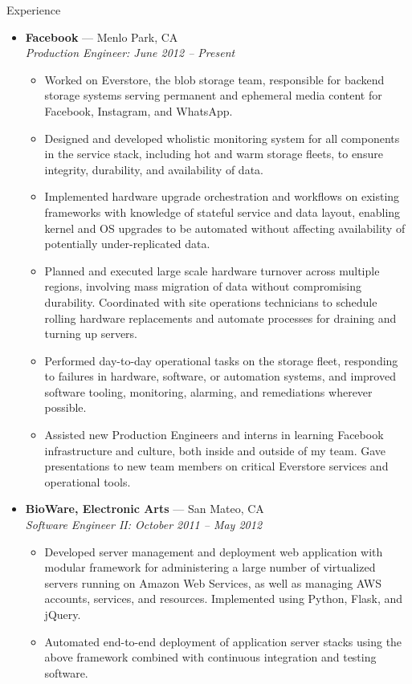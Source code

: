 \documentclass[11pt,oneside]{article}
\newenvironment{ressection}[1]{
    \vspace{8pt}
    {\fontfamily{phv}\selectfont\Large#1}
    \begin{itemize}
    \vspace{3pt}
}{
    \end{itemize}
}
\newcommand{\ressubitem}[1]{
    \vspace{-1pt}
    \item \begin{flushleft} #1 \end{flushleft}
}
\newcommand{\resbigitem}[3]{
    \vspace{-5pt}
    \item
    \textbf{#1} --- #2 \\
    \textit{#3}
}
\newenvironment{ressubsec}[3]{
    \resbigitem{#1}{#2}{#3}
    \vspace{-2pt}
    \begin{itemize}
}{
    \end{itemize}
}
\begin{document}
\begin{ressection}{Experience}

    \begin{ressubsec}{Facebook}{Menlo Park, CA}
    {Production Engineer: June 2012 -- Present}
        \ressubitem{Worked on Everstore, the blob storage team, responsible for backend
            storage systems serving permanent and ephemeral media content for Facebook,
            Instagram, and WhatsApp.}
        \ressubitem{Designed and developed wholistic monitoring system for all components
            in the service stack, including hot and warm storage fleets, to ensure integrity,
            durability, and availability of data.}
        \ressubitem{Implemented hardware upgrade orchestration and workflows on existing
            frameworks with knowledge of stateful service and data layout, enabling kernel
            and OS upgrades to be automated without affecting availability of potentially
            under-replicated data.}
        \ressubitem{Planned and executed large scale hardware turnover across multiple
            regions, involving mass migration of data without compromising durability.
            Coordinated with site operations technicians to schedule rolling hardware
            replacements and automate processes for draining and turning up servers.}
        \ressubitem{Performed day-to-day operational tasks on the storage fleet, responding
            to failures in hardware, software, or automation systems, and improved software
            tooling, monitoring, alarming, and remediations wherever possible.}
        \ressubitem{Assisted new Production Engineers and interns in learning Facebook
            infrastructure and culture, both inside and outside of my team. Gave presentations
            to new team members on critical Everstore services and operational tools.}
    \end{ressubsec}

    \begin{ressubsec}{BioWare, Electronic Arts}{San Mateo, CA}
    {Software Engineer II: October 2011 -- May 2012}
        \ressubitem{Developed server management and deployment web application with
        modular framework for administering a large number of virtualized servers
        running on Amazon Web Services, as well as managing AWS accounts, services, and
        resources.  Implemented using Python, Flask, and jQuery.}
        \ressubitem{Automated end-to-end deployment of application server stacks using
            the above framework combined with continuous integration and testing software.}
    \end{ressubsec}

\end{ressection}
\end{document}
